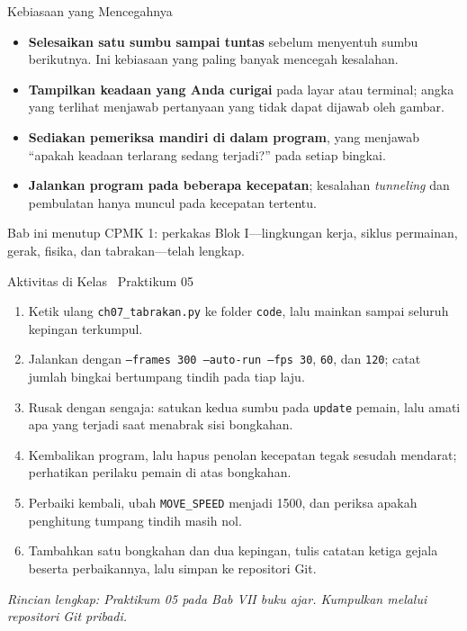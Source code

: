 \documentclass[aspectratio=169,10pt]{beamer}
\begin{document}
\begin{frame}{Kebiasaan yang Mencegahnya}
\begin{itemize}
  \item \textbf{Selesaikan satu sumbu sampai tuntas} sebelum menyentuh sumbu
        berikutnya. Ini kebiasaan yang paling banyak mencegah kesalahan.
  \item \textbf{Tampilkan keadaan yang Anda curigai} pada layar atau terminal;
        angka yang terlihat menjawab pertanyaan yang tidak dapat dijawab oleh
        gambar.
  \item \textbf{Sediakan pemeriksa mandiri di dalam program}, yang menjawab
        ``apakah keadaan terlarang sedang terjadi?'' pada setiap bingkai.
  \item \textbf{Jalankan program pada beberapa kecepatan}; kesalahan
        \emph{tunneling} dan pembulatan hanya muncul pada kecepatan tertentu.
\end{itemize}
\vspace{0.14cm}
\begin{kotak}
Bab ini menutup CPMK 1: perkakas Blok I---lingkungan kerja, siklus permainan,
gerak, fisika, dan tabrakan---telah lengkap.
\end{kotak}
\end{frame}

\begin{frame}{Aktivitas di Kelas \textperiodcentered\ Praktikum 05}
\begin{enumerate}
  \item Ketik ulang \texttt{ch07\_tabrakan.py} ke folder \texttt{code}, lalu
        mainkan sampai seluruh kepingan terkumpul.
  \item Jalankan dengan \texttt{--frames 300 --auto-run --fps 30}, \texttt{60},
        dan \texttt{120}; catat jumlah bingkai bertumpang tindih pada tiap laju.
  \item Rusak dengan sengaja: satukan kedua sumbu pada \texttt{update} pemain,
        lalu amati apa yang terjadi saat menabrak sisi bongkahan.
  \item Kembalikan program, lalu hapus penolan kecepatan tegak sesudah
        mendarat; perhatikan perilaku pemain di atas bongkahan.
  \item Perbaiki kembali, ubah \texttt{MOVE\_SPEED} menjadi 1500, dan periksa
        apakah penghitung tumpang tindih masih nol.
  \item Tambahkan satu bongkahan dan dua kepingan, tulis catatan ketiga gejala
        beserta perbaikannya, lalu simpan ke repositori Git.
\end{enumerate}
\vspace{0.10cm}
{\footnotesize\color{ubAccent}\itshape Rincian lengkap: Praktikum 05 pada Bab VII
buku ajar. Kumpulkan melalui repositori Git pribadi.}
\end{frame}
\end{document}

